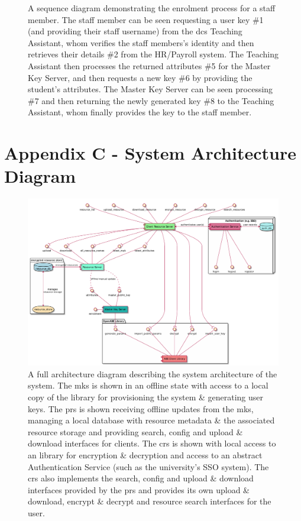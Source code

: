\begin{appendices}
\begin{figure}
    \caption{A sequence diagram demonstrating the enrolment process for a staff member. The staff member can be seen requesting a user key \#1 (and providing their staff username) from the \acrshort{dcs} Teaching Assistant, whom verifies the staff members's identity and then retrieves their details \#2 from the HR/Payroll system. The Teaching Assistant then processes the returned attributes \#5 for the Master Key Server, and then requests a new key \#6 by providing the student's attributes. The Master Key Server can be seen processing \#7 and then returning the newly generated key \#8 to the Teaching Assistant, whom finally provides the key to the staff member.}

\end{figure}

\section{Appendix C - System Architecture Diagram}
\label{appendix:architecture_diagram}

\begin{figure}
    \centering
    \includegraphics[width=\linewidth,keepaspectratio]{appendices/diagrams/infrastructure/system_architecture.pdf}

    \caption{
      A full architecture diagram describing the system architecture of the \theResServer system.
      The \acrfull{mks} is shown in an offline state with access to a local copy of the \OpenABE library for provisioning the system \& generating user keys. The \acrfull{prs} is shown receiving offline updates from the \acrshort{mks}, managing a local database with resource metadata \& the associated resource storage and providing search, config and upload \& download interfaces for clients. The \acrfull{crs} is shown with local access to an \OpenABE library for encryption \& decryption and access to an abstract Authentication Service (such as the university's SSO system). The \acrshort{crs} also implements the search, config and upload \& download interfaces provided by the \acrshort{prs} and provides its own upload \& download, encrypt \& decrypt and resource search interfaces for the user.
    }


\end{figure}
\end{appendices}
